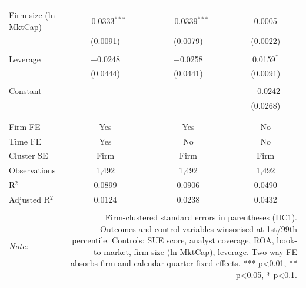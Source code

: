 \begin{table}[!htbp]
\begin{tabular}{@{\extracolsep{5pt}}lccc}
  & & & \\ 
 Firm size (ln MktCap) & $-$0.0333$^{***}$ & $-$0.0339$^{***}$ & 0.0005 \\ 
  & (0.0091) & (0.0079) & (0.0022) \\ 
  & & & \\ 
 Leverage & $-$0.0248 & $-$0.0258 & 0.0159$^{*}$ \\ 
  & (0.0444) & (0.0441) & (0.0091) \\ 
  & & & \\ 
 Constant &  &  & $-$0.0242 \\ 
  &  &  & (0.0268) \\ 
  & & & \\ 
\hline \\[-1.8ex] 
Firm FE & Yes & Yes & No \\ 
Time FE & Yes & No & No \\ 
Cluster SE & Firm & Firm & Firm \\ 
Observations & 1,492 & 1,492 & 1,492 \\ 
R$^{2}$ & 0.0899 & 0.0906 & 0.0490 \\ 
Adjusted R$^{2}$ & 0.0124 & 0.0238 & 0.0432 \\ 
\hline 
\hline \\[-1.8ex] 
\textit{Note:}  & \multicolumn{3}{r}{Firm-clustered standard errors in parentheses (HC1). Outcomes and control variables winsorised at 1st/99th percentile. Controls: SUE score, analyst coverage, ROA, book-to-market, firm size (ln MktCap), leverage. Two-way FE absorbs firm and calendar-quarter fixed effects. *** p<0.01, ** p<0.05, * p<0.1.} \\ 
\end{tabular} 
\end{table} 
